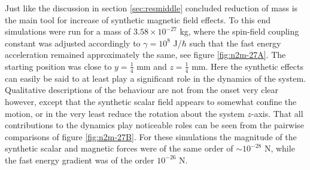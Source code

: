 \documentclass[main.tex]{subfiles}
\begin{document}
Just like the discussion in section \ref{sec:resmiddle} concluded reduction of mass is the
main tool for increase of synthetic magnetic field effects. To this end simulations were
run for a mass of \(3.58\times 10^{-27}\) kg, where the spin-field coupling constant was
adjusted accordingly to \(\gamma = 10^{8}\) J/\(\hbar{}\) such that the fast energy
acceleration remained approximately the same, see figure \ref{fig:n2m-27A}. The starting
position was close to \(y= \frac{1}{4}\) mm and \(z = \frac{1}{4}\) mm. Here the
synthetic effects can easily be said to at least play a significant role in the
dynamics of the system. Qualitative descriptions of the behaviour are not from the onset
very clear however, except that the synthetic scalar field appears to somewhat confine the
motion, or in the very least reduce the rotation about the system \(z\)-axis. That all
contributions to the dynamics play noticeable roles can be seen from the pairwise
comparisons of figure \ref{fig:n2m-27B}. For these simulations the magnitude of the
synthetic scalar and magnetic forces were of the same order of \(\sim 10^{-28}\) N, while
the fast energy gradient was of the order \(10^{-26}\) N.
\end{document}
